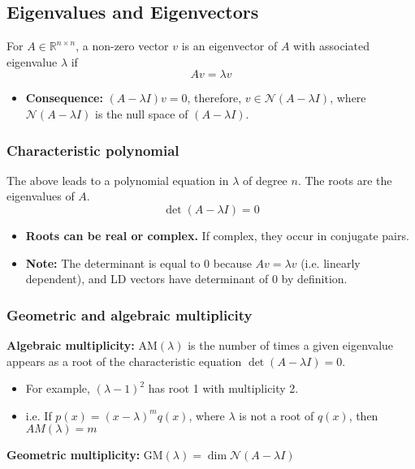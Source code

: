 \subsection{Eigenvalues and Eigenvectors}
\begin{definition}
    For $A \in \mathbb{R}^{n \times n}$, a non-zero vector $v$ is an eigenvector of $A$ with associated eigenvalue $\lambda$ if 
    \[
    A v = \lambda v
    \]
    \begin{itemize}
        \item \textbf{Consequence:} $(A - \lambda I) v = 0$, therefore, $v \in \mathcal{N}(A - \lambda I)$, where $\mathcal{N}(A - \lambda I)$ is the null space of $(A - \lambda I)$.    
    \end{itemize}
\end{definition}

\subsubsection{Characteristic polynomial}
\begin{definition} The above leads to a polynomial equation in $\lambda$ of degree $n$. The roots are the eigenvalues of $A$. 
    \[
    \det(A - \lambda I) = 0
    \]
    \begin{itemize}
        \item \textbf{Roots can be real or complex.} If complex, they occur in conjugate pairs.
        \item \textbf{Note:} The determinant is equal to 0 because $Av=\lambda v$ (i.e. linearly dependent), and LD vectors have determinant of $0$ by definition.
    \end{itemize}
\end{definition}

\subsubsection{Geometric and algebraic multiplicity}
\begin{definition}

    \textbf{Algebraic multiplicity:} $\text{AM}(\lambda)$ is the number of times a given eigenvalue appears as a root of the characteristic equation $\det(A - \lambda I) = 0$.
    \begin{itemize}
        \item For example, $(\lambda - 1)^2$ has root 1 with multiplicity 2.
        \item i.e. If $p(x)=(x-\lambda)^m q(x)$, where $\lambda$ is not a root of $q(x)$, then $AM(\lambda)=m$
    \end{itemize}
    \vspace{1em}

    \textbf{Geometric multiplicity:} $\text{GM}(\lambda) = \dim \mathcal{N}(A - \lambda I)$
\end{definition}

